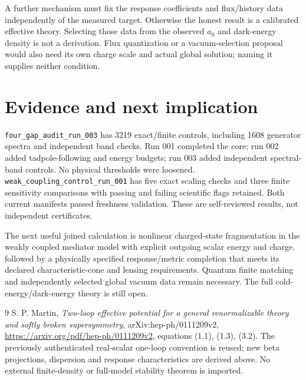 \documentclass[11pt]{article}
\begin{document}
A further mechanism must fix the response coefficients and flux/history
data independently of the measured target. Otherwise the honest result
is a calibrated effective theory. Selecting those data from the observed
$a_0$ and dark-energy density is not a derivation. Flux quantization or a
vacuum-selection proposal would also need its own charge scale and actual
global solution; naming it supplies neither condition.

\section{Evidence and next implication}
\texttt{four\_gap\_audit\_run\_003} has 3219 exact/finite controls,
including 1608 generator spectra and independent band checks. Run 001
completed the core; run 002 added tadpole-following and energy budgets;
run 003 added independent spectral-band controls. No physical thresholds
were loosened. \texttt{weak\_coupling\_control\_run\_001} has five exact
scaling checks and three finite sensitivity comparisons with passing and
failing scientific flags retained. Both current manifests passed freshness
validation. These are self-reviewed results, not independent certificates.

The next useful joined calculation is nonlinear charged-state fragmentation
in the weakly coupled mediator model with explicit outgoing scalar energy
and charge, followed by a physically specified response/metric completion
that meets its declared characteristic-cone and lensing requirements.
Quantum finite matching and independently selected global vacuum data
remain necessary. The full cold-energy/dark-energy theory is still open.

\begin{thebibliography}{9}
 S. P. Martin,
\emph{Two-loop effective potential for a general renormalizable theory and
softly broken supersymmetry}, arXiv:hep-ph/0111209v2,
\url{https://arxiv.org/pdf/hep-ph/0111209v2}, equations (1.1), (1.3), (3.2).
The previously authenticated real-scalar one-loop convention is reused;
new beta projections, dispersion and response characteristics are derived
above. No external finite-density or full-model stability theorem is imported.
\end{thebibliography}

\clearpage
\end{document}
